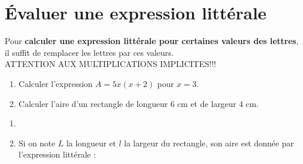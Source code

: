 \section{Évaluer une expression littérale}

\begin{methode*1}
    Pour \textbf{calculer une expression littérale pour certaines valeurs des lettres}, il suffit de remplacer les lettres par ces valeurs.\\
    ATTENTION AUX MULTIPLICATIONS IMPLICITES!!!
    \exercice
        \begin{enumerate}
            \item  Calculer l'expression $A=5x(x+2)$ pour $x=3$.
            \item Calculer l'aire d'un rectangle de longueur 6 cm et de largeur 4 cm.\par\vspace{5mm}
        \end{enumerate}
    \correction
    \begin{enumerate}
        \item  
        \item Si on note $L$ la longueur et $l$ la largeur du rectangle, son aire est donnée par l'expression littérale :
    \end{enumerate}
\end{methode*1}

